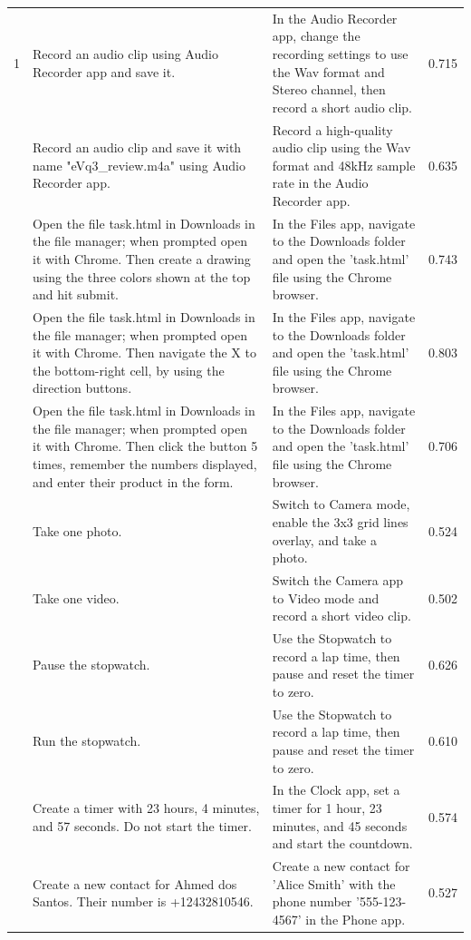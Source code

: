 \documentclass{article} %
\begin{document}
\begin{scriptsize}
\begin{longtable}{@{} c >{\raggedright\arraybackslash}p{} >{\raggedright\arraybackslash}p{} c @{}}
1 & Record an audio clip using Audio Recorder app and save it. & In the Audio Recorder app, change the recording settings to use the Wav format and Stereo channel, then record a short audio clip. & 0.715 \\
\addlinespace[2pt]
2 & Record an audio clip and save it with name "eVq3\_review.m4a" using Audio Recorder app. & Record a high-quality audio clip using the Wav format and 48kHz sample rate in the Audio Recorder app. & 0.635 \\
\addlinespace[2pt]
3 & Open the file task.html in Downloads in the file manager; when prompted open it with Chrome. Then create a drawing using the three colors shown at the top and hit submit. & In the Files app, navigate to the Downloads folder and open the 'task.html' file using the Chrome browser. & 0.743 \\
\addlinespace[2pt]
4 & Open the file task.html in Downloads in the file manager; when prompted open it with Chrome. Then navigate the X to the bottom-right cell, by using the direction buttons. & In the Files app, navigate to the Downloads folder and open the 'task.html' file using the Chrome browser. & 0.803 \\
\addlinespace[2pt]
5 & Open the file task.html in Downloads in the file manager; when prompted open it with Chrome. Then click the button 5 times, remember the numbers displayed, and enter their product in the form. & In the Files app, navigate to the Downloads folder and open the 'task.html' file using the Chrome browser. & 0.706 \\
\addlinespace[2pt]
6 & Take one photo. & Switch to Camera mode, enable the 3x3 grid lines overlay, and take a photo. & 0.524 \\
\addlinespace[2pt]
7 & Take one video. & Switch the Camera app to Video mode and record a short video clip. & 0.502 \\
\addlinespace[2pt]
8 & Pause the stopwatch. & Use the Stopwatch to record a lap time, then pause and reset the timer to zero. & 0.626 \\
\addlinespace[2pt]
9 & Run the stopwatch. & Use the Stopwatch to record a lap time, then pause and reset the timer to zero. & 0.610 \\
\addlinespace[2pt]
10 & Create a timer with 23 hours, 4 minutes, and 57 seconds. Do not start the timer. & In the Clock app, set a timer for 1 hour, 23 minutes, and 45 seconds and start the countdown. & 0.574 \\
\addlinespace[2pt]
11 & Create a new contact for Ahmed dos Santos. Their number is +12432810546. & Create a new contact for 'Alice Smith' with the phone number '555-123-4567' in the Phone app. & 0.527 \\

\end{longtable}
\end{scriptsize}
\end{document}

